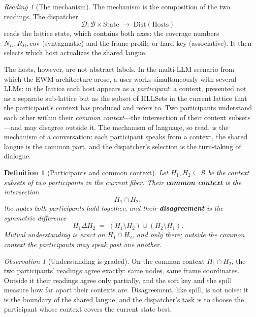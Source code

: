 \documentclass[11pt,a4paper]{article}
\newtheorem{definition}[principle]{Definition}
\theoremstyle{remark}
\newtheorem{observation}[principle]{Observation}
\newtheorem{reading}[principle]{Reading}
\newcommand{\Lat}{\ensuremath{\mathcal{B}}}              %
\newcommand{\xor}{\ensuremath{\Delta}}                   %
\newcommand{\Cov}{\ensuremath{\mathrm{cov}}}             %
\newcommand{\Disp}{\ensuremath{\mathcal{D}}}             %
\begin{document}
\begin{reading}[The mechanism]
\label{read:mechanism}
The mechanism is the composition of the two readings. The dispatcher
\[
  \Disp : \Lat \times \mathrm{State}
  \;\longrightarrow\;
  \mathrm{Dist}(\mathrm{Hosts})
\]
reads the lattice state, which contains both axes: the coverage numbers
$N_D,R_D,\Cov$ (syntagmatic) and the frame profile or hard key (associative).
It then selects which host actualizes the shared langue.

The hosts, however, are not abstract labels. In the multi-LLM scenario from
which the EWM architecture arose, a user works simultaneously with several
LLMs; in the lattice each host appears as a \emph{participant}: a context,
presented not as a separate sub-lattice but as the subset of HLLSets in the
current lattice that the participant's context has produced and refers to.
Two participants understand each other within their \emph{common
context}---the intersection of their context subsets---and may disagree
outside it. The mechanism of language, so read, is the mechanism of a
conversation: each participant speaks from a context, the shared langue is
the common part, and the dispatcher's selection is the turn-taking of
dialogue.
\end{reading}

\begin{definition}[Participants and common context]
\label{def:participants}
Let $H_1, H_2 \subseteq \Lat$ be the context subsets of two participants in
the current fiber. Their \textbf{common context} is the intersection
\[
  H_1 \cap H_2,
\]
the nodes both participants hold together, and their \textbf{disagreement} is
the symmetric difference
\[
  H_1 \xor H_2 \;=\; (H_1 \setminus H_2) \cup (H_2 \setminus H_1).
\]
Mutual understanding is exact on $H_1 \cap H_2$, and only there; outside the
common context the participants may speak past one another.
\end{definition}

\begin{observation}[Understanding is graded]
\label{obs:graded-understanding}
On the common context $H_1 \cap H_2$, the two participants' readings agree
exactly: same nodes, same frame coordinates. Outside it their readings agree
only partially, and the soft key and the spill measure how far apart their
contexts are. Disagreement, like spill, is not noise: it is the boundary of
the shared langue, and the dispatcher's task is to choose the participant
whose context covers the current state best.
\end{observation}
\end{document}
